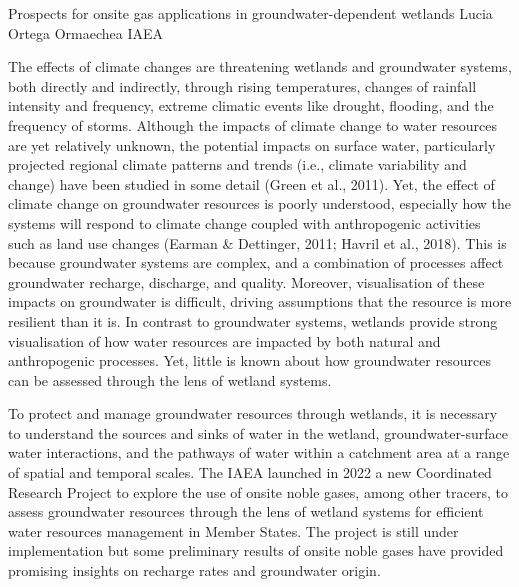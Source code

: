 \begin{conf-abstract}
{Prospects for onsite gas applications in groundwater-dependent wetlands}
{Lucia Ortega Ormaechea}
{IAEA}
{The effects of climate changes are threatening wetlands and groundwater systems, both directly and indirectly, through rising temperatures, changes of rainfall intensity and frequency, extreme climatic events like drought, flooding, and the frequency of storms. Although the impacts of climate change to water resources are yet relatively unknown, the potential impacts on surface water, particularly projected regional climate patterns and trends (i.e., climate variability and change) have been studied in some detail (Green et al., 2011). Yet, the effect of climate change on groundwater resources is poorly understood, especially how the systems will respond to climate change coupled with anthropogenic activities such as land use changes (Earman \& Dettinger, 2011; Havril et al., 2018). This is because groundwater systems are complex, and a combination of processes affect groundwater recharge, discharge, and quality. Moreover, visualisation of these impacts on groundwater is difficult, driving assumptions that the resource is more resilient than it is. In contrast to groundwater systems, wetlands provide strong visualisation of how water resources are impacted by both natural and anthropogenic processes. Yet, little is known about how groundwater resources can be assessed through the lens of wetland systems. 

To protect and manage groundwater resources through wetlands, it is necessary to understand the sources and sinks of water in the wetland, groundwater-surface water interactions, and the pathways of water within a catchment area at a range of spatial and temporal scales. The IAEA launched in 2022 a new Coordinated Research Project to explore the use of onsite noble gases, among other tracers, to assess groundwater resources through the lens of wetland systems for efficient water resources management in Member States. The project is still under implementation but some preliminary results of onsite noble gases have provided promising insights on recharge rates and groundwater origin.}
\end{conf-abstract}
